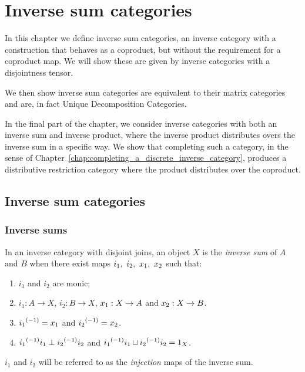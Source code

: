 \chapter{Inverse sum categories} %
\label{cha:inverse_sum_categories}

In this chapter we define inverse sum categories, an inverse category with a construction that
behaves as a coproduct, but without the requirement for a coproduct map. We will show these are
given by inverse categories with a disjointness tensor.

We then show inverse sum categories are equivalent to their matrix categories and are, in fact
Unique Decomposition Categories\cite{haghverdi:2000phd}.

In the final part of the chapter, we consider inverse categories with both an inverse sum and
inverse product, where the inverse product distributes overs the inverse sum in a specific way. We
show that completing such a category, in the sense of
Chapter~\ref{chap:completing_a_discrete_inverse_category}, produces a distributive restriction
category where the product distributes over the coproduct.

\section{Inverse sum categories} %
\label{sec:inverse_sum_categories}

\subsection{Inverse sums} %
\label{sub:inverse_sums}

\begin{definition}\label{def:inverse_sum}
  In an inverse category with disjoint joins, an object $X$ is the \emph{inverse sum} of $A$ and
  $B$ when there exist maps $i_1,\ i_2,\ \xa,\ \xb$ such that:
  \begin{enumerate}[{(}i{)}]
    \item $i_1$ and $i_2$ are monic;
    \item $i_1 : A \to X$, $i_2: B \to X$, $x_1: X \to A$ and $x_2: X \to B$.
    \item ${i_1}^{(-1)} = x_1$ and ${i_2}^{(-1)} = x_2$.
    \item ${i_1}^{(-1)}i_1 \perp {i_2}^{(-1)}i_2$ and ${i_1}^{(-1)}i_1 \sqcup {i_2}^{(-1)}i_2 = 1_X$.
  \end{enumerate}
  $i_1$ and $i_2$ will be referred to as the \emph{injection} maps of the inverse sum.
\end{definition}

